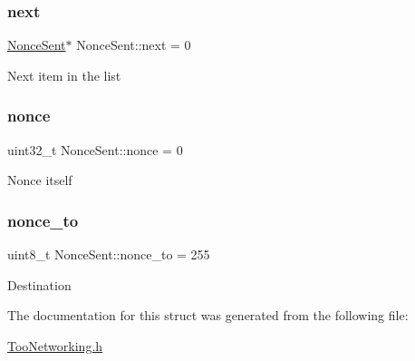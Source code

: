 \subsubsection{\texorpdfstring{next}{next}}
{\footnotesize\ttfamily \hyperlink{structNonceSent}{Nonce\+Sent}$\ast$ Nonce\+Sent\+::next = 0}

Next item in the list \mbox{\label{structNonceSent_ae9d167a911c22c9d4490d2fee2093c10}} 
\subsubsection{\texorpdfstring{nonce}{nonce}}
{\footnotesize\ttfamily uint32\+\_\+t Nonce\+Sent\+::nonce = 0}

Nonce itself \mbox{\label{structNonceSent_ad5484888a11a0c041610c38b564c5627}} 
\subsubsection{\texorpdfstring{nonce\+\_\+to}{nonce\_to}}
{\footnotesize\ttfamily uint8\+\_\+t Nonce\+Sent\+::nonce\+\_\+to = 255}

Destination 

The documentation for this struct was generated from the following file\+:\begin{DoxyCompactItemize}
\item 
\hyperlink{TooNetworking_8h}{Too\+Networking.\+h}\end{DoxyCompactItemize}
